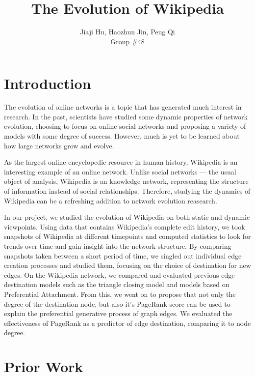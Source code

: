 \documentclass[10pt,twocolumn]{article}
\begin{document}
\title{The Evolution of Wikipedia}
\author{Jiaji Hu, Haozhun Jin, Peng Qi\\Group \#48}
\date{}
\maketitle

\section{Introduction}

The evolution of online networks is a topic that has generated much interest in research. In the past, scientists have studied some dynamic properties of network evolution, choosing to focus on online social networks and proposing a variety of models with some degree of success. However, much is yet to be learned about how large networks grow and evolve.

As the largest online encyclopedic resource in human history, Wikipedia is an interesting example of an online network. Unlike social networks --- the usual object of analysis, Wikipedia is an knowledge network, representing the structure of information instead of social relationships. Therefore, studying the dynamics of Wikipedia can be a refreshing addition to network evolution reasearch.

In our project, we studied the evolution of Wikipedia on both static and dynamic viewpoints. Using data that contains Wikipedia's complete edit history, we took snapshots of Wikipedia at different timepoints and computed statistics to look for trends over time and gain insight into the network structure. By comparing snapshots taken between a short period of time, we singled out individual edge creation processes and studied them, focusing on the choice of destination for new edges. On the Wikipedia network, we compared and evaluated previous edge destination models such as the triangle closing model and models based on Preferential Attachment. From this, we went on to propose that not only the degree of the destination node, but also it's PageRank score can be used to explain the preferential generative process of graph edges. We evaluated the effectiveness of PageRank as a predictor of edge destination, comparing it to node degree.
\section{Prior Work}
\end{document}
